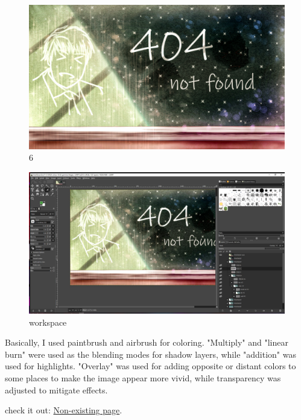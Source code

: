 \documentclass[11pt]{article}
\begin{document}
\begin{spacing}{1.0}
\begin{itemize}
\begin{figure}[H]
	\end{figure}
	\begin{figure}[H]
		\centering
		\includegraphics[scale=.4]{figures/png/6.jpg}
		\caption{6}

	\end{figure}
	

	\begin{figure}[H]
		\centering
		\includegraphics[scale=.3]{figures/png/gimp.jpg}
		\caption{workspace}

	\end{figure}
	Basically, I used paintbrush and airbrush for coloring. "Multiply" and "linear burn" were used as the blending modes for shadow layers, while "addition" was used for highlights. "Overlay" was used for adding opposite or distant colors to some places to make the image appear more vivid, while transparency was adjusted to mitigate effects.
	
	check it out:
	\href{https://royalcvmaker.uk/Imlost}{Non-existing page}.
	

\end{itemize}
\end{spacing}
\end{document}
